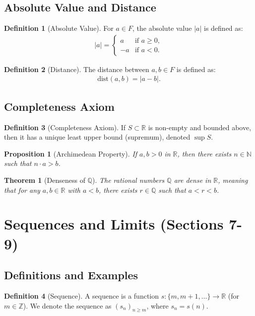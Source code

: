 \documentclass[9pt]{article}
\theoremstyle{definition}
\newtheorem{definition}{Definition}
\theoremstyle{plain}
\newtheorem{theorem}{Theorem}
\newtheorem{proposition}{Proposition}
\begin{document}
\subsection*{Absolute Value and Distance}
\begin{definition}[Absolute Value]
For $ a \in F $, the absolute value $ |a| $ is defined as:
\begin{align}
|a| =
\begin{cases}
a & \text{if } a \geq 0, \\
-a & \text{if } a < 0.
\end{cases}
\end{align}
\end{definition}

\begin{definition}[Distance]
The distance between $ a, b \in F $ is defined as:
\begin{align}
\text{dist}(a, b) = |a - b|.
\end{align}
\end{definition}

\subsection*{Completeness Axiom}
\begin{definition}[Completeness Axiom]
If $ S \subset \mathbb{R} $ is non-empty and bounded above, then it has a unique least upper bound (supremum), denoted $ \sup S $.
\end{definition}

\begin{proposition}[Archimedean Property]
If $ a, b > 0 $ in $ \mathbb{R} $, then there exists $ n \in \mathbb{N} $ such that $ n \cdot a > b $.
\end{proposition}

\begin{theorem}[Denseness of $ \mathbb{Q} $]
The rational numbers $ \mathbb{Q} $ are dense in $ \mathbb{R} $, meaning that for any $ a, b \in \mathbb{R} $ with $ a < b $, there exists $ r \in \mathbb{Q} $ such that $ a < r < b $.
\end{theorem}
\section*{Sequences and Limits (Sections 7-9)}

\subsection*{Definitions and Examples}
\begin{definition}[Sequence]
A sequence is a function $ s : \{m, m + 1, \dots \} \to \mathbb{R} $ (for $ m \in \mathbb{Z} $). We denote the sequence as $ (s_n)_{n \geq m} $, where $ s_n = s(n) $.
\end{definition}
\end{document}
